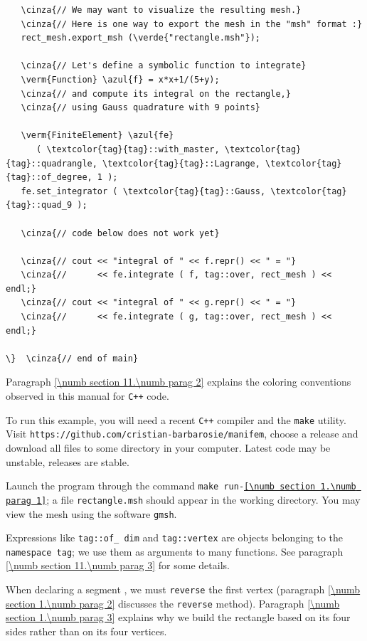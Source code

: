 \begin{Verbatim}
   \cinza{// We may want to visualize the resulting mesh.}
   \cinza{// Here is one way to export the mesh in the "msh" format :}
   rect_mesh.export_msh (\verde{"rectangle.msh"});

   \cinza{// Let's define a symbolic function to integrate}
   \verm{Function} \azul{f} = x*x+1/(5+y);
   \cinza{// and compute its integral on the rectangle,}
   \cinza{// using Gauss quadrature with 9 points}

   \verm{FiniteElement} \azul{fe}
      ( \textcolor{tag}{tag}::with_master, \textcolor{tag}{tag}::quadrangle, \textcolor{tag}{tag}::Lagrange, \textcolor{tag}{tag}::of_degree, 1 );
   fe.set_integrator ( \textcolor{tag}{tag}::Gauss, \textcolor{tag}{tag}::quad_9 );

   \cinza{// code below does not work yet}

   \cinza{// cout << "integral of " << f.repr() << " = "}
   \cinza{//      << fe.integrate ( f, tag::over, rect_mesh ) << endl;}
   \cinza{// cout << "integral of " << g.repr() << " = "}
   \cinza{//      << fe.integrate ( g, tag::over, rect_mesh ) << endl;}

\}  \cinza{// end of main}
\end{Verbatim}

Paragraph \ref{\numb section 11.\numb parag 2} explains the coloring conventions observed
in this manual for {\tt C++} code.

To run this example, you will need a recent {\tt C++} compiler and the {\tt make} utility.
Visit {\small\tt https://github.com/cristian-barbarosie/manifem}, choose a release
and download all files to some directory in your computer.
Latest code may be unstable, releases are stable.

Launch the program through the command
{\small\tt make run-\ref{\numb section 1.\numb parag 1}};
a file {\small\tt rectangle.msh} should appear in the working directory.
You may view the mesh using the software {\tt gmsh}.

Expressions like {\small\tt \textcolor{tag}{tag}::of\_\,dim} and {\small\tt \textcolor{tag}{tag}::vertex} are
objects belonging to the {\small\tt namespace \textcolor{tag}{tag}};
we use them as arguments to many functions.
See paragraph \ref{\numb section 11.\numb parag 3} for some details.

When declaring a segment {\small\tt {}}, we must {\small\tt reverse} the first vertex
(paragraph \ref{\numb section 1.\numb parag 2} discusses the {\small\tt reverse} method).
Paragraph \ref{\numb section 1.\numb parag 3} explains why we build
the rectangle based on its four sides rather than on its four vertices.

